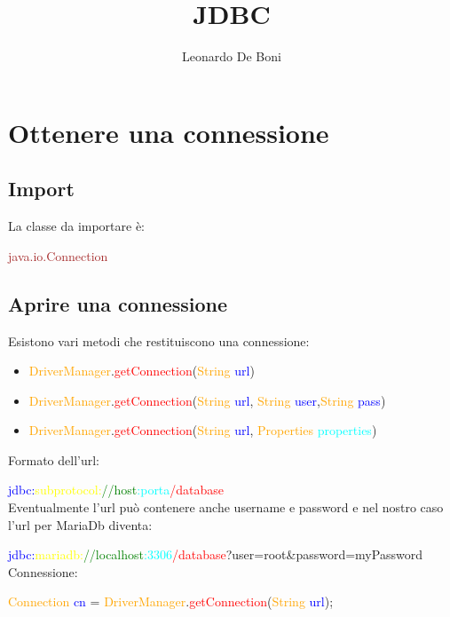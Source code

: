 \documentclass[11pt, letterpaper, titlepage]{article}
\begin{document}
\title{JDBC}
\author{Leonardo De Boni}
\maketitle
\tableofcontents
\newpage

\section{Ottenere una connessione}

\subsection{Import}
La classe da importare è:\par
\textcolor{brown}{java.io.Connection}

\subsection{Aprire una connessione}
Esistono vari metodi che restituiscono una connessione:
\begin{itemize}
    \item \textcolor{orange}{DriverManager}.\textcolor{red}{getConnection}(\textcolor{orange}{String} \textcolor{blue}{url})
    \item \textcolor{orange}{DriverManager}.\textcolor{red}{getConnection}(\textcolor{orange}{String} \textcolor{blue}{url}, \textcolor{orange}{String} \textcolor{blue}{user},\textcolor{orange}{String} \textcolor{blue}{pass})
    \item \textcolor{orange}{DriverManager}.\textcolor{red}{getConnection}(\textcolor{orange}{String} \textcolor{blue}{url}, \textcolor{orange}{Properties} \textcolor{cyan}{properties})
\end{itemize}
Formato dell'url:\par
\textcolor{blue}{jdbc:}\textcolor{yellow}{subprotocol:}\textcolor{green}{//host}\textcolor{cyan}{:porta}\textcolor{red}{/database}\\
Eventualmente l'url può contenere anche username e password e nel nostro caso l'url per MariaDb diventa:\par
\textcolor{blue}{jdbc:}\textcolor{yellow}{mariadb:}\textcolor{green}{//localhost}\textcolor{cyan}{:3306}\textcolor{red}{/database}?user=root\&password=myPassword\\
Connessione:\par
\textcolor{orange}{Connection} \textcolor{blue}{cn} = \textcolor{orange}{DriverManager}.\textcolor{red}{getConnection}(\textcolor{orange}{String} \textcolor{blue}{url});
\end{document}
